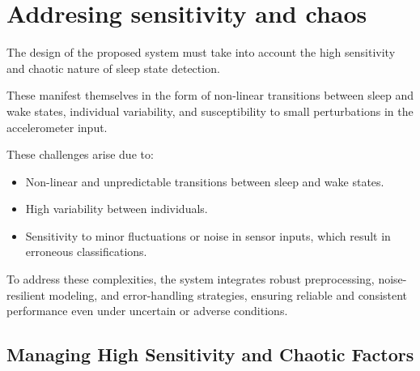 \documentclass[conference]{IEEEtran}
\begin{document}
\section{Addresing sensitivity and chaos}

The design of the proposed system must take into account the high sensitivity and chaotic nature of sleep state detection.

These manifest themselves in the form of non-linear transitions between sleep and wake states, individual variability, and susceptibility to small perturbations in the accelerometer input.

These challenges arise due to:
\begin{itemize}
\item Non-linear and unpredictable transitions between sleep and wake states.
\item High variability between individuals.
\item Sensitivity to minor fluctuations or noise in sensor inputs, which result in erroneous classifications.
\end{itemize}

To address these complexities, the system integrates robust preprocessing, noise-resilient modeling, and error-handling strategies, ensuring reliable and consistent performance even under uncertain or adverse conditions.

\subsection{Managing High Sensitivity and Chaotic Factors}
\end{document}
